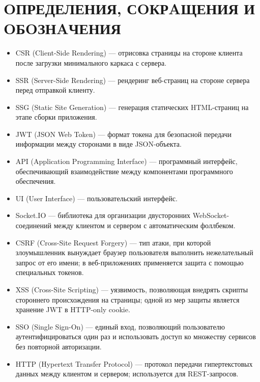 \newpage
{}
\section*{OПРЕДЕЛЕНИЯ, СOКРAЩЕНИЯ И OБOЗНAЧЕНИЯ}

\begin{itemize}
  \item CSR (Client-Side Rendering) — отрисовка страницы на стороне клиента после загрузки минимального каркаса с сервера.
  \item SSR (Server-Side Rendering) — рендеринг веб-страниц на стороне сервера перед отправкой клиенту.
  \item SSG (Static Site Generation) — генерация статических HTML-страниц на этапе сборки приложения.
  \item JWT (JSON Web Token) — формат токена для безопасной передачи информации между сторонами в виде JSON-объекта.
  \item API (Application Programming Interface) — программный интерфейс, обеспечивающий взаимодействие между компонентами программного обеспечения.
  \item UI (User Interface) — пользовательский интерфейс.
  \item Socket.IO — библиотека для организации двусторонних WebSocket-соединений между клиентом и сервером с автоматическим фоллбеком.
  \item CSRF (Cross-Site Request Forgery) — тип атаки, при которой злоумышленник вынуждает браузер пользователя выполнить нежелательный запрос от его имени; в веб-приложениях применяется защита с помощью специальных токенов.
  \item XSS (Cross-Site Scripting) — уязвимость, позволяющая внедрять скрипты стороннего происхождения на страницы; одной из мер защиты является хранение JWT в HTTP-only cookie.
  \item SSO (Single Sign-On) — единый вход, позволяющий пользователю аутентифицироваться один раз и использовать доступ ко множеству сервисов без повторной авторизации.
  \item HTTP (Hypertext Transfer Protocol) — протокол передачи гипертекстовых данных между клиентом и сервером; используется для REST-запросов.

\end{itemize}

